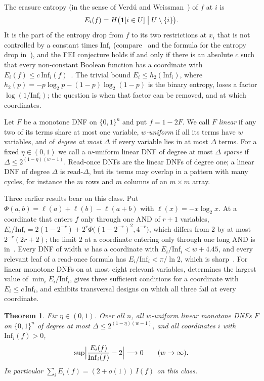 \documentclass[11pt]{amsart}
\newtheorem{theorem}{Theorem}
\theoremstyle{remark}
\newcommand{\Inf}{\mathrm{Inf}}
\begin{document}
The erasure entropy (in the sense of Verd\'u and Weissman~\cite{VW08}) of $f$ at $i$ is
\[
E_i(f)=H\bigl(\mathbf 1[i\in U]\bigm| U\setminus\{i\}\bigr).
\]
It is the part of the entropy drop from $f$ to its two restrictions at $x_i$ that is not controlled by a constant times
$\Inf_i$ (compare~\cite[Remark~3.2]{Han} and the formula for the entropy drop in~\cite{GMP}), and the FEI conjecture holds if and only if there is an
absolute $c$ such that every non-constant Boolean function has a coordinate with $E_i(f)\le c\,\Inf_i(f)$~\cite{Shm1}.
The trivial bound $E_i\le h_2(\Inf_i)$, where $h_2(p)=-p\log_2p-(1-p)\log_2(1-p)$ is the binary entropy, loses a factor $\log(1/\Inf_i)$; the question is when that factor can be
removed, and at which coordinates.

Let $F$ be a monotone DNF on $\{0,1\}^n$ and put $f=1-2F$. We call $F$ \emph{linear} if any two of its terms share at
most one variable, \emph{$w$-uniform} if all its terms have $w$ variables, and of \emph{degree at most $\Delta$} if
every variable lies in at most $\Delta$ terms. For a fixed $\eta\in(0,1)$ we call a $w$-uniform linear DNF of degree at
most $\Delta$ \emph{sparse} if $\Delta\le2^{(1-\eta)(w-1)}$. Read-once DNFs are the linear DNFs of degree one; a linear
DNF of degree $\Delta$ is read-$\Delta$, but its terms may overlap in a pattern with many cycles, for instance the $m$
rows and $m$ columns of an $m\times m$ array.

Three earlier results bear on this class. Put $\Phi(a,b)=\ell(a)+\ell(b)-\ell(a+b)$ with $\ell(x)=-x\log_2x$. At a
coordinate that enters $f$ only through one AND of $r+1$ variables,
$E_i/\Inf_i=2(1-2^{-r})+2^r\Phi\bigl((1-2^{-r})^2,4^{-r}\bigr)$, which differs from $2$ by at most $2^{-r}(2r+2)$; the
limit $2$ at a coordinate entering only through one long AND is in~\cite{ShmFilt}. Every DNF of width $w$ has a
coordinate with $E_i/\Inf_i<w+4.45$, and every relevant leaf of a read-once formula has $E_i/\Inf_i<\pi/\ln2$, which is
sharp~\cite{ShmGood}. For linear monotone DNFs on at most eight relevant variables, \cite{ShmCensus} determines the
largest value of $\min_iE_i/\Inf_i$, gives three sufficient conditions for a coordinate with $E_i\le c\,\Inf_i$, and
exhibits transversal designs on which all three fail at every coordinate.

\begin{theorem}\label{thm:main}
Fix $\eta\in(0,1)$. Over all $n$, all $w$-uniform linear monotone DNFs $F$ on $\{0,1\}^n$ of degree at most
$\Delta\le2^{(1-\eta)(w-1)}$, and all coordinates $i$ with $\Inf_i(f)>0$,
\[
\sup\Bigl|\frac{E_i(f)}{\Inf_i(f)}-2\Bigr|\longrightarrow0\qquad(w\to\infty).
\]
In particular $\sum_iE_i(f)=(2+o(1))\,I(f)$ on this class.
\end{theorem}
\end{document}
